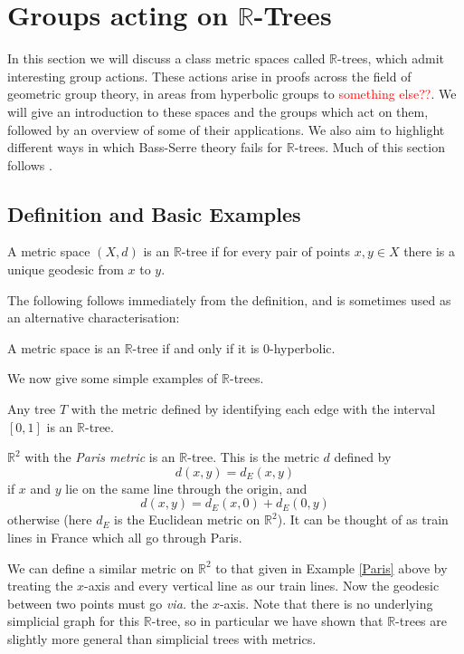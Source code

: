 \section{Groups acting on $\mathbb{R}$-Trees}

In this section we will discuss a class metric spaces called $\mathbb{R}$-trees, which admit interesting group actions. These actions arise in proofs across the field of geometric group theory, in areas from hyperbolic groups to \textcolor{red}{something else??}. We will give an introduction to these spaces and the groups which act on them, followed by an overview of some of their applications. We also aim to highlight different ways in which Bass-Serre theory fails for $\mathbb{R}$-trees. Much of this section follows \cite{Bestvina_trees}.
\subsection{Definition and Basic Examples}
\begin{definition}
    A metric space $(X,d)$ is an \textnormal{$\mathbb{R}$-tree} if for every pair of points $x,y\in X$ there is a unique geodesic from $x$ to $y$.
\end{definition}

The following follows immediately from the definition, and is sometimes used as an alternative characterisation:

\begin{proposition}
    A metric space is an $\mathbb{R}$-tree if and only if it is 0-hyperbolic.
\end{proposition}

We now give some simple examples of $\mathbb{R}$-trees.

\begin{example}
    Any tree $T$ with the metric defined by identifying each edge with the interval $[0,1]$ is an $\mathbb{R}$-tree.
\end{example}

\begin{example}\label{Paris}
    $\mathbb{R}^2$ with the \textit{Paris metric} is an $\mathbb{R}$-tree. This is the metric $d$ defined by\[d(x,y)=d_E(x,y)\]if $x$ and $y$ lie on the same line through the origin, and\[d(x,y)=d_E(x,0)+d_E(0,y)\] otherwise (here $d_E$ is the Euclidean metric on $\mathbb{R}^2$). It can be thought of as train lines in France which all go through Paris.
\end{example}

\begin{example}\label{xtrains}
    We can define a similar metric on $\mathbb{R}^2$ to that given in Example \ref{Paris} above by treating the $x$-axis and every vertical line as our train lines. Now the geodesic between two points must go \textit{via.} the $x$-axis. Note that there is no underlying simplicial graph for this $\mathbb{R}$-tree, so in particular we have shown that $\mathbb{R}$-trees are slightly more general than simplicial trees with metrics.
\end{example}

